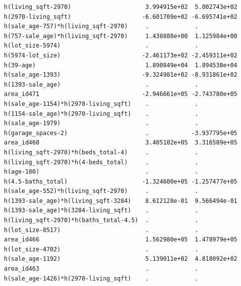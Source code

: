 \documentclass[
]{article}
\begin{document}
\begin{verbatim}
h(living_sqft-2970)                     3.994915e+02  5.002743e+02
h(2970-living_sqft)                    -6.601709e+02 -6.695741e+02
h(sale_age-757)*h(living_sqft-2970)     .             .           
h(757-sale_age)*h(living_sqft-2970)     1.438888e+00  1.125984e+00
h(lot_size-5974)                        .             .           
h(5974-lot_size)                       -2.461173e+02 -2.459311e+02
h(39-age)                               1.890849e+04  1.894538e+04
h(sale_age-1393)                       -9.324981e+02 -8.931861e+02
h(1393-sale_age)                        .             .           
area_id471                             -2.946661e+05 -2.743780e+05
h(sale_age-1154)*h(2970-living_sqft)    .             .           
h(1154-sale_age)*h(2970-living_sqft)    .             .           
h(sale_age-1979)                        .             .           
h(garage_spaces-2)                      .            -3.937795e+05
area_id460                              3.405102e+05  3.316589e+05
h(living_sqft-2970)*h(beds_total-4)     .             .           
h(living_sqft-2970)*h(4-beds_total)     .             .           
h(age-100)                              .             .           
h(4.5-baths_total)                     -1.324600e+05 -1.257477e+05
h(sale_age-552)*h(living_sqft-2970)     .             .           
h(1393-sale_age)*h(living_sqft-3284)    8.612128e-01  9.566494e-01
h(1393-sale_age)*h(3284-living_sqft)    .             .           
h(living_sqft-2970)*h(baths_total-4.5)  .             .           
h(lot_size-8517)                        .             .           
area_id466                              1.562980e+05  1.478979e+05
h(lot_size-4702)                        .             .           
h(sale_age-1192)                        5.139011e+02  4.818092e+02
area_id463                              .             .           
h(sale_age-1426)*h(2970-living_sqft)    .             .           
                                                                  

\end{verbatim}
\end{document}

